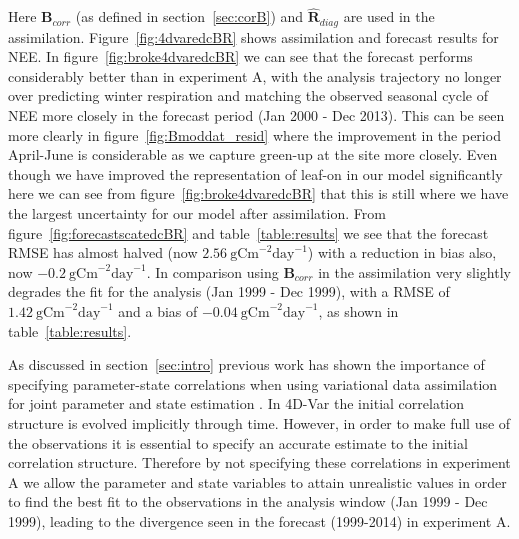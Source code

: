 \documentclass[review]{elsarticle}
\begin{document}
Here $\textbf{B}_{corr}$ (as defined in section~\ref{sec:corB}) and $\hat{\textbf{R}}_{diag}$ are used in the assimilation. Figure~\ref{fig:4dvaredcBR} shows assimilation and forecast results for NEE. In figure~\ref{fig:broke4dvaredcBR} we can see that the forecast performs considerably better than in experiment A, with the analysis trajectory no longer over predicting winter respiration and matching the observed seasonal cycle of NEE more closely in the forecast period (Jan 2000 - Dec 2013). This can be seen more clearly in figure~\ref{fig:Bmoddat_resid} where the improvement in the period April-June is considerable as we capture green-up at the site more closely. Even though we have improved the representation of leaf-on in our model significantly here we can see from figure~\ref{fig:broke4dvaredcBR} that this is still where we have the largest uncertainty for our model after assimilation. From figure~\ref{fig:forecastscatedcBR} and table~\ref{table:results} we see that the forecast RMSE has almost halved (now $2.56 ~\text{gCm}^{-2}\text{day}^{-1}$) with a reduction in bias also, now $-0.2 ~\text{gCm}^{-2}\text{day}^{-1}$. In comparison using $\textbf{B}_{corr}$ in the assimilation very slightly degrades the fit for the analysis (Jan 1999 - Dec 1999), with a RMSE of $1.42 ~\text{gCm}^{-2}\text{day}^{-1}$ and a bias of $-0.04 ~\text{gCm}^{-2}\text{day}^{-1}$, as shown in table~\ref{table:results}. 

As discussed in section~\ref{sec:intro} previous work has shown the importance of specifying parameter-state correlations when using variational data assimilation for joint parameter and state estimation \citep{smith2009variational}. In 4D-Var the initial correlation structure is evolved implicitly through time. However, in order to make full use of the observations it is essential to specify an accurate estimate to the initial correlation structure. Therefore by not specifying these correlations in experiment A we allow the parameter and state variables to attain unrealistic values in order to find the best fit to the observations in the analysis window (Jan 1999 - Dec 1999), leading to the divergence seen in the forecast (1999-2014) in experiment A.
 
\end{document}
